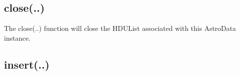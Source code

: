 \documentclass[letterpaper,10pt,english]{sphinxmanual}
\begin{document}
\subsection{close(..)}
\label{chapter_AstroDataClass:close}

\begin{fulllineitems}
\label{chapter_AstroDataClass:astrodata.data.AstroData.close}
The close(..) function will close the HDUList associated with this
AstroData instance.

\end{fulllineitems}



\subsection{insert(..)}
\label{chapter_AstroDataClass:insert}
\end{document}
